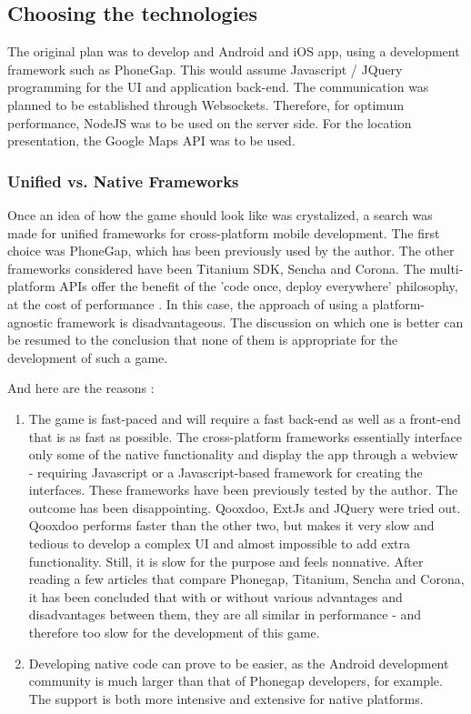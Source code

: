 \subsection{Choosing the technologies}

The original plan was to develop and Android and iOS app, using a development
framework such as PhoneGap. This would assume Javascript / JQuery programming
for the UI and application back-end. The communication was planned to be
established through Websockets. Therefore, for optimum performance, NodeJS was
to be used on the server side. For the location presentation, the Google Maps
API was to be used. 

\subsubsection{Unified vs. Native Frameworks}

Once an idea of how the game should look like was crystalized, a search was
made for unified frameworks for cross-platform mobile development. The first
choice was PhoneGap, which has been previously used by the author. The other
frameworks considered have been Titanium SDK, Sencha and Corona. The
multi-platform APIs offer the benefit of the 'code once, deploy everywhere'
philosophy, at the cost of performance \cite{nativevscrossplatform}
\cite{nativevscrossplatform2} \cite{nativevscrossplatform3}.
In this case, the approach of using a platform-agnostic framework is
disadvantageous. The discussion on which one is better can be resumed to the
conclusion that none of them is appropriate for the development of such a
game.\newline

And here are the reasons : 
\begin{enumerate}
  \item The game is fast-paced and will require a fast back-end as well as a
  front-end that is as fast as possible. The cross-platform frameworks
  essentially interface only some of the native functionality and display the
  app through a webview - requiring Javascript or a Javascript-based framework
  for creating the interfaces. These frameworks have been previously tested by
  the author. The outcome has been disappointing. Qooxdoo, ExtJs and JQuery were
  tried out. Qooxdoo performs faster than the other two, but makes it very slow
  and tedious to develop a complex UI and almost impossible to add extra
  functionality. Still, it is slow for the purpose and feels nonnative. After
  reading a few articles that compare Phonegap, Titanium, Sencha and Corona, it
  has been concluded that with or without various advantages and disadvantages
  between them, they are all similar in performance - and therefore too slow for
  the development of this game.
  
  \item Developing native code can prove to be easier, as the Android
  development community is much larger than that of Phonegap developers, for
  example. The support is both more intensive and extensive for native
  platforms. 
  
\end{enumerate}

